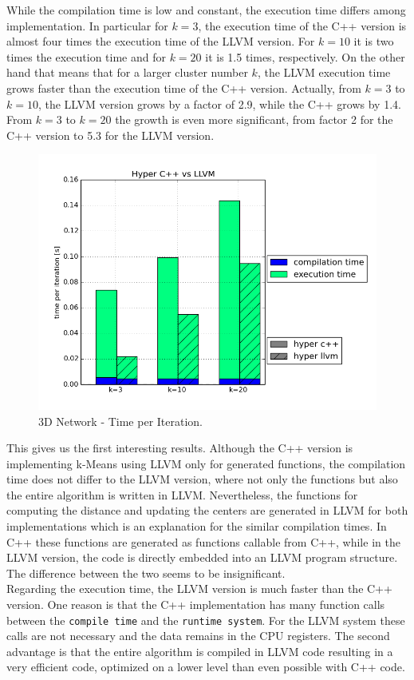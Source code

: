  While the compilation time is low and constant, the execution time differs among implementation. In particular for $k = 3$, the execution time of the C++ version is almost four times the execution time of the LLVM version. For $k = 10$ it is two times the execution time and for $k = 20$ it is 1.5 times, respectively. On the other hand that means that for a larger cluster number $k$, the LLVM execution time grows  faster than the execution time of the C++ version. Actually, from $k = 3$ to $k = 10$, the LLVM version grows by a factor of 2.9, while the C++ grows by 1.4. From $k = 3$ to $k = 20$ the growth is even more significant, from factor 2 for the C++ version to 5.3 for the LLVM version.


\begin{figure}[htsb]
  \centering
  \includegraphics[scale=0.4, trim="0cm 1.5cm 0cm 0cm"]{figures/charts/hyper_network}
  \caption[3D Network - Time per Iteration]{3D Network - Time per Iteration.}
  \label{fig:hyper_network}
\end{figure}

This gives us the first interesting results. Although the C++ version is implementing k-Means using LLVM only for generated functions, the compilation time does not differ to the LLVM version, where not only the functions but also the entire algorithm is written in LLVM. Nevertheless, the functions for computing the distance and updating the centers are generated in LLVM for both implementations which is an explanation for the similar compilation times. In C++ these functions are generated as functions callable from C++, while in the LLVM version, the code is directly embedded into an LLVM program structure. The difference between the two seems to be insignificant.
\\
Regarding the execution time, the LLVM version is much faster than the C++ version. One reason is that the C++ implementation has many function calls between the \texttt{compile time} and the \texttt{runtime system}. For the LLVM system these calls are not necessary and the data remains in the CPU registers. The second advantage is that the entire algorithm is compiled in LLVM code resulting in a very efficient code, optimized on a lower level than even possible with C++ code.


